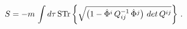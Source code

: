 \begin{equation}\label{3.1}
{S}=-m\, \int d\tau\,{\rm STr}\left\{ \sqrt{\left(
1-\dot\Phi^{i}\,Q^{-1}_{ij}\,\dot\Phi^{j}\right)\,det\,Q^{ij}}\right\}\,.
\end{equation}

